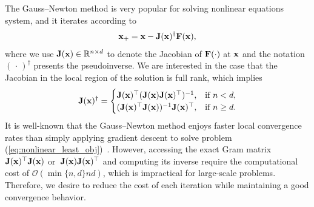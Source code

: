 \documentclass[11pt]{article}
\theoremstyle{plain}
\theoremstyle{definition}
\theoremstyle{remark}
\theoremstyle{plain}
\def\vx{{\bf{x}}}
\def\BR{{\mathbb{R}}}
\def\vx {{{\bf x}}}
\def\BR{{\mathbb{R}}}
\def\F{{\bf F}}
\def \J{{\bf J}}
\def\x{{\bf x}}
\def\0{{\bf 0}}
\def\OM{{\mathcal O}}
\begin{document}
The Gauss--Newton method is very popular for solving nonlinear equations system, and it iterates according to
\begin{align}  
\label{update:gn}
    \x_{+} = \x-\J(\x)^{\dag}\F(\x),
\end{align}
where we use $\J(\x)\in\BR^{n\times d}$ to denote the Jacobian of $\F(\cdot)$ at $\vx$ and the notation $(\,\cdot\,)^{\dag}$ presents the pseudoinverse.
We are interested in the case that the Jacobian in the local region of the solution is full rank, which implies 
\begin{align}\label{update:gnJ}
\J(\x)^{\dag}=\begin{cases}
    \J(\x)^{\top}(\J(\x)\J(\x)^{\top})^{-1}, &\text{if }n<d,\\
	 (\J(\x)^{\top}\J(\x))^{-1}\J(\x)^{\top}, &\text{if }n\geq d.    
\end{cases}
\end{align}
It is well-known that the Gauss--Newton method enjoys faster local convergence rates than simply applying gradient descent to solve problem (\ref{eq:nonlinear_least_obj})~\citep{gratton2007approximate,ortega2000iterative,nesterov2018lectures}. 
However, accessing the exact Gram matrix $\J(\x)^{\top}\J(\x)$ 
or~$\J(\x)\J(\x)^{\top}$ and 
computing its inverse require the computational cost of 
$\OM(\min\{n,d\}nd)$, which is impractical for large-scale problems.
Therefore, we desire to reduce the cost of each iteration while maintaining a good convergence behavior.
\end{document}
